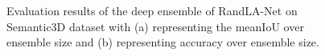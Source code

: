     \begin{figure}[htbp]
        \begin{subfigure}{0.495\textwidth}
            
            \caption{}
            \label{fig:meaniou_de}   
        \end{subfigure}
        \begin{subfigure}{0.495\textwidth}
            
            \caption{}
            \label{fig:acc_de}
        \end{subfigure}
        \caption{Evaluation results of the deep ensemble of RandLA-Net on Semantic3D dataset with (a) representing the meanIoU over ensemble size and (b) representing accuracy over ensemble size.}
    \end{figure}

 

